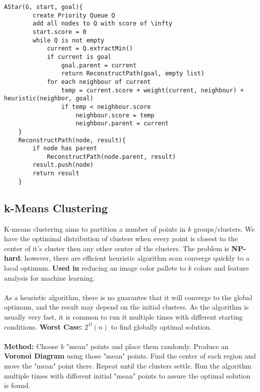 \documentclass{article}
\begin{document}
	\begin{lstlisting}[style=pseudo]
	AStar(G, start, goal){
		create Priority Queue Q
		add all nodes to Q with score of \infty
		start.score = 0
		while Q is not empty
			current = Q.extractMin()
			if current is goal
				goal.parent = current
				return ReconstructPath(goal, empty list)
			for each neighbour of current
				temp = current.score + weight(current, neighbour) + heuristic(neighbor, goal)
				if temp < neighbour.score
					neighbour.score = temp
					neighbour.parent = current
	}
	ReconstructPath(node, result){
		if node has parent
			ReconstructPath(node.parent, result)
		result.push(node)
		return result
	}
	\end{lstlisting}



	\subsection{k-Means Clustering}

	K-means clustering aims to partition a number of points in $k$ groups/clusters. We have the optiminal distribution of clusters when every point is closest to the center of it's cluster then any other center of the clusters. The problem is {\bf NP-hard}; however, there are efficient heuristic algorithm scan converge quickly to a local optimum. {\bf Used in} reducing an image color pallete to $k$ colors and feature analysis for machine learning.
	\\ \\
	As a heuristic algorithm, there is no guarantee that it will converge to the global optimum, and the result may depend on the initial clusters. As the algorithm is usually very fast, it is common to run it multiple times with different starting conditions. {\bf Worst Case:} $2^\Omega(n)$ to find globally optimal solution.
	\\ \\
	{\bf Method:} Choose $k$ "mean" points and place them randomly. Produce an {\bf Voronoi Diagram} using those "mean" points. Find the center of each region and move the "mean" point there. Repeat until the clusters settle. Run the algorithm multiple times with different initial "mean" points to assure the optimal solution is found.
\end{document}
